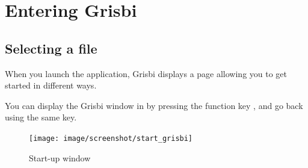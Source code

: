 
\chapter{Entering Grisbi\label{entrance}}%

\section{Selecting a file\label{select-file}}%


When you launch the application, Grisbi displays a page allowing you to get started in different ways.%


You can display the Grisbi window in  by pressing the function key , and go back using the same key.%


\begin{figure}[htbp]			%
	\begin{center}					%
		\texttt{[image: image/screenshot/start\_grisbi]}		%
	\end{center}
	\caption{Start-up window}%
	\label{start_grisbi}					%
\end{figure}

